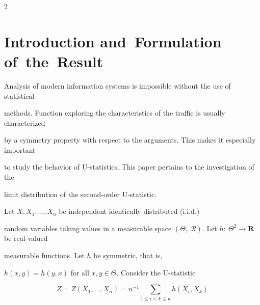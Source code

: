 


      \thispagestyle{headings}



      \begin{multicols}{2}



            \label{st\stat}





\section{Introduction and~Formulation of~the~Result}



\noindent

Analysis of modern information systems is impossible without the use of statistical 

methods. Function exploring the characteristics of the traffic is usually characterized 

by a symmetry property with respect to the arguments. This makes it especially important 

to study the behavior of U-statistics. This paper pertains to the investigation of the 

limit distribution of the second-order U-statistic.



Let $X,X_1,\ldots ,X_n$ be independent identically distributed (i.i.d.)\

random variables taking values in a measurable space  $(\Theta, \

\mathcal{R})$. Let $h: \ \Theta^{2}\rightarrow\mathbf{R}$ be real-valued

measurable functions. Let $h$ be symmetric, that is,

$h(x,y)=h(y,x)$ for all $x,y\in\Theta$. Consider the \mbox{U-statistic}



\vspace*{2pt}



\noindent

\begin{equation}

\label{e1-y}

  Z=Z(X_1,\ldots ,X_n)=n^{-1} \sum\limits_{1\leq i<k\leq n}h(X_i,X_k)

\end{equation}


\end{multicols}
